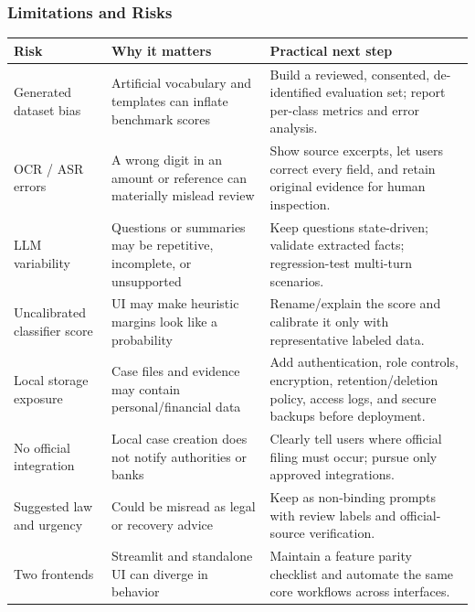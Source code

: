 \documentclass[12pt,a4paper,oneside]{report}
\begin{document}
\subsubsection{Limitations and Risks}
\begin{longtable}{|>{\RaggedRight\arraybackslash}p{}|>{\RaggedRight\arraybackslash}p{}|>{\RaggedRight\arraybackslash}p{}|}
\hline
\textbf{Risk} & \textbf{Why it matters} & \textbf{Practical next step} \\\hline
Generated dataset bias & Artificial vocabulary and templates can inflate benchmark scores & Build a reviewed, consented, de-identified evaluation set; report per-class metrics and error analysis. \\\hline
OCR / ASR errors & A wrong digit in an amount or reference can materially mislead review & Show source excerpts, let users correct every field, and retain original evidence for human inspection. \\\hline
LLM variability & Questions or summaries may be repetitive, incomplete, or unsupported & Keep questions state-driven; validate extracted facts; regression-test multi-turn scenarios. \\\hline
Uncalibrated classifier score & UI may make heuristic margins look like a probability & Rename/explain the score and calibrate it only with representative labeled data. \\\hline
Local storage exposure & Case files and evidence may contain personal/financial data & Add authentication, role controls, encryption, retention/deletion policy, access logs, and secure backups before deployment. \\\hline
No official integration & Local case creation does not notify authorities or banks & Clearly tell users where official filing must occur; pursue only approved integrations. \\\hline
Suggested law and urgency & Could be misread as legal or recovery advice & Keep as non-binding prompts with review labels and official-source verification. \\\hline
Two frontends & Streamlit and standalone UI can diverge in behavior & Maintain a feature parity checklist and automate the same core workflows across interfaces. \\\hline
\end{longtable}
\vspace{2mm}
\end{document}
